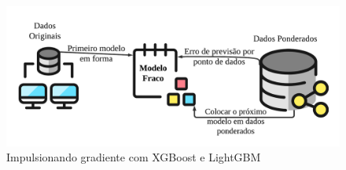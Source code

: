 \begin{figure}[H]
	\centering
	\caption{Impulsionando gradiente com XGBoost e LightGBM}
	\label{fig:xgboos}
	\includegraphics[width=\linewidth]{Modelos/Figuras/xgboos}
	
\end{figure}



%
%
%
%


